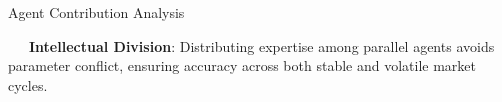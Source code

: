\documentclass{beamer}
\begin{document}
\begin{frame}{Agent Contribution Analysis}
\vspace{0.15cm}
\begin{tcolorbox}[enhanced, colback=primaryblue!4, colframe=primaryblue!30, boxrule=0.35pt,
  arc=3.5pt, width=0.98\textwidth, left=4pt, right=4pt, top=2.5pt, bottom=2.5pt, boxsep=0pt,
  halign=center, shadow={0.5pt}{-0.5pt}{0pt}{black!8}]
    \fontsize{5.5pt}{6.5pt}\selectfont
    \textcolor{primaryDark}{~~~\textbf{Intellectual Division}: Distributing expertise among parallel agents avoids parameter conflict, ensuring accuracy across both stable and volatile market cycles.}
\end{tcolorbox}
\end{frame}

\end{document}
